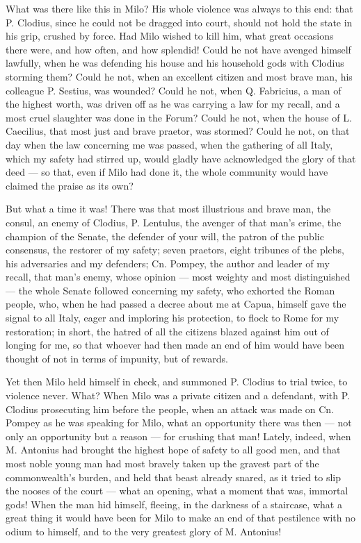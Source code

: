  What was there like this in Milo? His whole violence was always to this end: that P. Clodius, since he could not be dragged into court, should not hold the state in his grip, crushed by force. Had Milo wished to kill him, what great occasions there were, and how often, and how splendid! Could he not have avenged himself lawfully, when he was defending his house and his household gods with Clodius storming them? Could he not, when an excellent citizen and most brave man, his colleague P. Sestius, was wounded? Could he not, when Q. Fabricius, a man of the highest worth, was driven off as he was carrying a law for my recall, and a most cruel slaughter was done in the Forum? Could he not, when the house of L. Caecilius, that most just and brave praetor, was stormed? Could he not, on that day when the law concerning me was passed, when the gathering of all Italy, which my safety had stirred up, would gladly have acknowledged the glory of that deed --- so that, even if Milo had done it, the whole community would have claimed the praise as its own?

 But what a time it was! There was that most illustrious and brave man, the consul, an enemy of Clodius, P. Lentulus, the avenger of that man's crime, the champion of the Senate, the defender of your will, the patron of the public consensus, the restorer of my safety; seven praetors, eight tribunes of the plebs, his adversaries and my defenders; Cn. Pompey, the author and leader of my recall, that man's enemy, whose opinion --- most weighty and most distinguished --- the whole Senate followed concerning my safety, who exhorted the Roman people, who, when he had passed a decree about me at Capua, himself gave the signal to all Italy, eager and imploring his protection, to flock to Rome for my restoration; in short, the hatred of all the citizens blazed against him out of longing for me, so that whoever had then made an end of him would have been thought of not in terms of impunity, but of rewards.

 Yet then Milo held himself in check, and summoned P. Clodius to trial twice, to violence never. What? When Milo was a private citizen and a defendant, with P. Clodius prosecuting him before the people, when an attack was made on Cn. Pompey as he was speaking for Milo, what an opportunity there was then --- not only an opportunity but a reason --- for crushing that man! Lately, indeed, when M. Antonius had brought the highest hope of safety to all good men, and that most noble young man had most bravely taken up the gravest part of the commonwealth's burden, and held that beast already snared, as it tried to slip the nooses of the court --- what an opening, what a moment that was, immortal gods! When the man hid himself, fleeing, in the darkness of a staircase, what a great thing it would have been for Milo to make an end of that pestilence with no odium to himself, and to the very greatest glory of M. Antonius!

